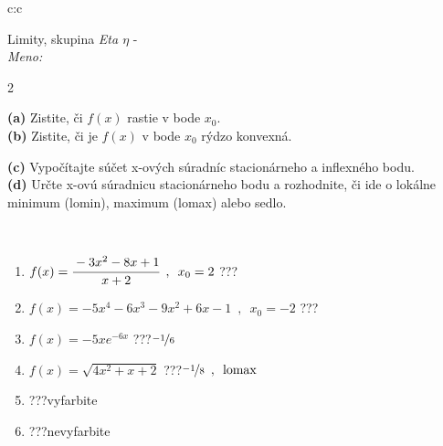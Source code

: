 \documentclass[10pt]{report}
\begin{document}
\begin{tabular}{c:c}
\begin{minipage}[c][104.5mm][t]{0.5\linewidth}
\begin{center}
\vspace{7mm}
{\huge Limity, skupina \textit{Eta $\eta$} -}\\[5mm]
\textit{Meno:}\phantom{xxxxxxxxxxxxxxxxxxxxxxxxxxxxxxxxxxxxxxxxxxxxxxxxxxxxxxxxxxxxxxxxx}\\[5mm]
\begin{minipage}{0.95\linewidth}
\begin{center}
{\small \begin{multicols}{2} \raggedright
\textbf{(a)} Zistite, či \(f(x)\) rastie v bode \(x_0\). \\[1mm]
\textbf{(b)} Zistite, či je \(f(x)\) v bode \(x_0\) rýdzo konvexná. \par \columnbreak
\textbf{(c)} Vypočítajte súčet x-ových súradníc stacionárneho a inflexného bodu. \\[1mm]
\textbf{(d)} Určte x-ovú súradnicu stacionárneho bodu a rozhodnite, či ide o lokálne minimum (lomin), maximum (lomax) alebo sedlo. \\[1mm]
\end{multicols}
}
\end{center}
\end{minipage}
\\[4mm]
\begin{minipage}{0.79\linewidth}
\begin{center}
\begin{varwidth}{\linewidth}
\begin{enumerate}
\normalsize
\item $f(x)=\cfrac{-3x^2-8x+1}{x+2}\enspace , \enspace x_0=2$\quad \dotfill\; ???\;\dotfill \quad {}
\item $f(x)=-5x^4-6x^3-9x^2+6x-1\enspace , \enspace x_0=-2$\quad \dotfill\; ???\;\dotfill \quad {}
\item $f(x)=-5xe^{-6x}$\quad \dotfill\; ???\;\dotfill \quad $\nicefrac{-1}{6}$
\item $f(x)=\sqrt{4x^2+x+2}$\quad \dotfill\; ???\;\dotfill \quad $\nicefrac{-1}{8}\enspace , \enspace\text{lomax}$
\item \quad \dotfill\; ???\;\dotfill \quad vyfarbite
\item \quad \dotfill\; ???\;\dotfill \quad nevyfarbite
\end{enumerate}
\end{varwidth}
\end{center}

\end{minipage}
\end{center}
\end{minipage}
\end{tabular}
\end{document}
